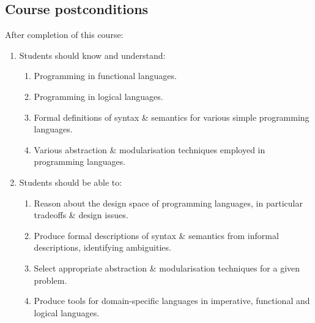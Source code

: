 \documentclass[11pt]{article}
\theoremstyle{definition}
\begin{document}
\subsection{Course postconditions}
\label{sec:org2a35ad4}
After completion of this course:

\begin{enumerate}
\item Students should know and understand:
\begin{enumerate}
\item Programming in functional languages.
\item Programming in logical languages.
\item Formal definitions of syntax \& semantics for various
simple programming languages.
\item Various abstraction \& modularisation techniques
employed in programming languages.
\end{enumerate}
\item Students should be able to:
\begin{enumerate}
\item Reason about the design space of programming languages,
in particular tradeoffs \& design issues.
\item Produce formal descriptions of syntax \& semantics
from informal descriptions, identifying ambiguities.
\item Select appropriate abstraction \& modularisation techniques
for a given problem.
\item Produce tools for domain-specific languages
in imperative, functional and logical languages.
\end{enumerate}
\end{enumerate}
\end{document}

